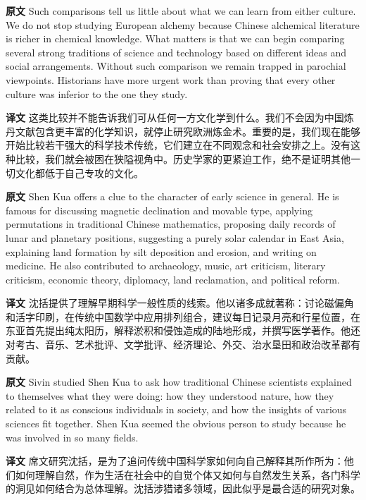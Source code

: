 \documentclass[UTF8,zihao=-4]{ctexart}
\newcommand{\BodyFont}{\fontsize{10.5pt}{15.5pt}\selectfont}
\newcommand{\origlabel}{\textbf{原文}\quad}
\newcommand{\translabel}{\textbf{译文}\quad}
\newenvironment{enblock}{\par\noindent\begingroup\BodyFont\origlabel}{\par\endgroup}
\newenvironment{zhblock}{\par\noindent\begingroup\BodyFont\translabel}{\par\endgroup\vspace{0.35em}}
\begin{document}
\begin{enblock}
Such comparisons tell us little about what we can learn from either culture. We do not stop studying European alchemy because Chinese alchemical literature is richer in chemical knowledge. What matters is that we can begin comparing several strong traditions of science and technology based on different ideas and social arrangements. Without such comparison we remain trapped in parochial viewpoints. Historians have more urgent work than proving that every other culture was inferior to the one they study.
\end{enblock}
\begin{zhblock}
这类比较并不能告诉我们可从任何一方文化学到什么。我们不会因为中国炼丹文献包含更丰富的化学知识，就停止研究欧洲炼金术。重要的是，我们现在能够开始比较若干强大的科学技术传统，它们建立在不同观念和社会安排之上。没有这种比较，我们就会被困在狭隘视角中。历史学家的更紧迫工作，绝不是证明其他一切文化都低于自己专攻的文化。
\end{zhblock}

\begin{enblock}
Shen Kua offers a clue to the character of early science in general. He is famous for discussing magnetic declination and movable type, applying permutations in traditional Chinese mathematics, proposing daily records of lunar and planetary positions, suggesting a purely solar calendar in East Asia, explaining land formation by silt deposition and erosion, and writing on medicine. He also contributed to archaeology, music, art criticism, literary criticism, economic theory, diplomacy, land reclamation, and political reform.
\end{enblock}
\begin{zhblock}
沈括提供了理解早期科学一般性质的线索。他以诸多成就著称：讨论磁偏角和活字印刷，在传统中国数学中应用排列组合，建议每日记录月亮和行星位置，在东亚首先提出纯太阳历，解释淤积和侵蚀造成的陆地形成，并撰写医学著作。他还对考古、音乐、艺术批评、文学批评、经济理论、外交、治水垦田和政治改革都有贡献。
\end{zhblock}

\begin{enblock}
Sivin studied Shen Kua to ask how traditional Chinese scientists explained to themselves what they were doing: how they understood nature, how they related to it as conscious individuals in society, and how the insights of various sciences fit together. Shen Kua seemed the obvious person to study because he was involved in so many fields.
\end{enblock}
\begin{zhblock}
席文研究沈括，是为了追问传统中国科学家如何向自己解释其所作所为：他们如何理解自然，作为生活在社会中的自觉个体又如何与自然发生关系，各门科学的洞见如何结合为总体理解。沈括涉猎诸多领域，因此似乎是最合适的研究对象。
\end{zhblock}
\end{document}
